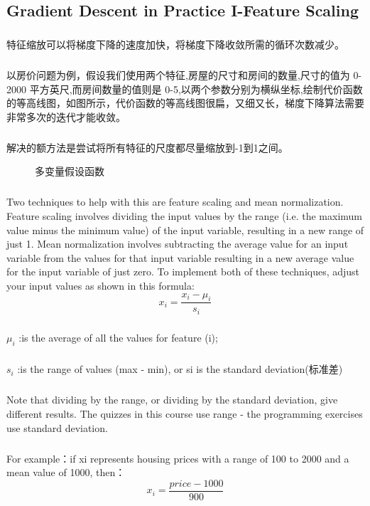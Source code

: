\documentclass{article}
\begin{document}
\begin{CJK}{UTF8}{gbsn}
\subsection{Gradient Descent in Practice I-Feature Scaling}
\subparagraph*{}
特征缩放可以将梯度下降的速度加快，将梯度下降收敛所需的循环次数减少。
\subparagraph*{}
以房价问题为例，假设我们使用两个特征,房屋的尺寸和房间的数量,尺寸的值为 0-2000 平方英尺,而房间数量的值则是 0-5,以两个参数分别为横纵坐标,绘制代价函数的等高线图，如图所示，代价函数的等高线图很扁，又细又长，梯度下降算法需要非常多次的迭代才能收敛。
\subparagraph*{}
解决的额方法是尝试将所有特征的尺度都尽量缩放到-1到1之间。
\begin{figure}[H]
\caption{多变量假设函数}
\label{fig:224}
\end{figure}
\subparagraph*{}
Two techniques to help with this are feature scaling and mean normalization. Feature scaling involves dividing the input values by the range (i.e. the maximum value minus the minimum value) of the input variable, resulting in a new range of just 1. Mean normalization involves subtracting the average value for an input variable from the values for that input variable resulting in a new average value for the input variable of just zero. To implement both of these techniques, adjust your input values as shown in this formula:
\begin{equation}
x_i=\frac{x_i-\mu_i}{s_i}
\end{equation}
\subparagraph*{}
$\mu_i$ :is the average of all the values for feature (i);
\subparagraph*{}
$s_i$ :is the range of values (max - min), or si is the standard deviation(标准差)
\subparagraph*{}
Note that dividing by the range, or dividing by the standard deviation, give different results. The quizzes in this course use range - the programming exercises use standard deviation.
\subparagraph*{}
For example：if xi represents housing prices with a range of 100 to 2000 and a mean value of 1000, then：
\begin{equation}
x_i=\frac{price-1000}{900}
\end{equation}

\end{CJK}
\end{document}
